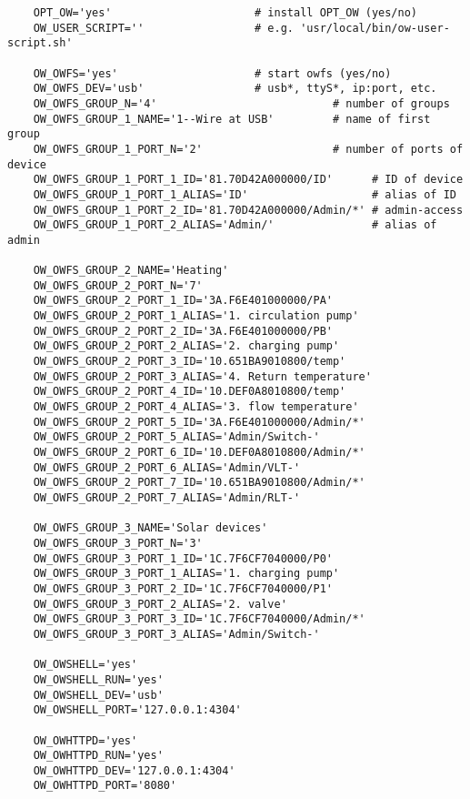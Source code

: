 \begin{example}
\begin{verbatim}
    OPT_OW='yes'                      # install OPT_OW (yes/no)
    OW_USER_SCRIPT=''                 # e.g. 'usr/local/bin/ow-user-script.sh'

    OW_OWFS='yes'                     # start owfs (yes/no)
    OW_OWFS_DEV='usb'                 # usb*, ttyS*, ip:port, etc.
    OW_OWFS_GROUP_N='4'                           # number of groups
    OW_OWFS_GROUP_1_NAME='1--Wire at USB'         # name of first group
    OW_OWFS_GROUP_1_PORT_N='2'                    # number of ports of device
    OW_OWFS_GROUP_1_PORT_1_ID='81.70D42A000000/ID'      # ID of device
    OW_OWFS_GROUP_1_PORT_1_ALIAS='ID'                   # alias of ID
    OW_OWFS_GROUP_1_PORT_2_ID='81.70D42A000000/Admin/*' # admin-access
    OW_OWFS_GROUP_1_PORT_2_ALIAS='Admin/'               # alias of admin

    OW_OWFS_GROUP_2_NAME='Heating'
    OW_OWFS_GROUP_2_PORT_N='7'
    OW_OWFS_GROUP_2_PORT_1_ID='3A.F6E401000000/PA'
    OW_OWFS_GROUP_2_PORT_1_ALIAS='1. circulation pump'
    OW_OWFS_GROUP_2_PORT_2_ID='3A.F6E401000000/PB'
    OW_OWFS_GROUP_2_PORT_2_ALIAS='2. charging pump'
    OW_OWFS_GROUP_2_PORT_3_ID='10.651BA9010800/temp'
    OW_OWFS_GROUP_2_PORT_3_ALIAS='4. Return temperature'
    OW_OWFS_GROUP_2_PORT_4_ID='10.DEF0A8010800/temp'
    OW_OWFS_GROUP_2_PORT_4_ALIAS='3. flow temperature'
    OW_OWFS_GROUP_2_PORT_5_ID='3A.F6E401000000/Admin/*'
    OW_OWFS_GROUP_2_PORT_5_ALIAS='Admin/Switch-'
    OW_OWFS_GROUP_2_PORT_6_ID='10.DEF0A8010800/Admin/*'
    OW_OWFS_GROUP_2_PORT_6_ALIAS='Admin/VLT-'
    OW_OWFS_GROUP_2_PORT_7_ID='10.651BA9010800/Admin/*'
    OW_OWFS_GROUP_2_PORT_7_ALIAS='Admin/RLT-'

    OW_OWFS_GROUP_3_NAME='Solar devices'
    OW_OWFS_GROUP_3_PORT_N='3'
    OW_OWFS_GROUP_3_PORT_1_ID='1C.7F6CF7040000/P0'
    OW_OWFS_GROUP_3_PORT_1_ALIAS='1. charging pump'
    OW_OWFS_GROUP_3_PORT_2_ID='1C.7F6CF7040000/P1'
    OW_OWFS_GROUP_3_PORT_2_ALIAS='2. valve'
    OW_OWFS_GROUP_3_PORT_3_ID='1C.7F6CF7040000/Admin/*'
    OW_OWFS_GROUP_3_PORT_3_ALIAS='Admin/Switch-'

    OW_OWSHELL='yes'
    OW_OWSHELL_RUN='yes'
    OW_OWSHELL_DEV='usb'
    OW_OWSHELL_PORT='127.0.0.1:4304'

    OW_OWHTTPD='yes'
    OW_OWHTTPD_RUN='yes'
    OW_OWHTTPD_DEV='127.0.0.1:4304'
    OW_OWHTTPD_PORT='8080'
\end{verbatim}
\end{example}

